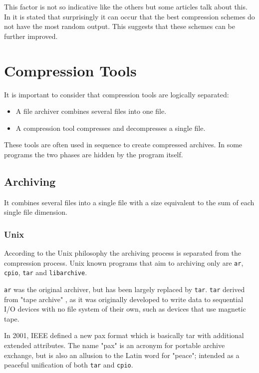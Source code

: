 \documentclass[12pt, a4paper]{report}
\begin{document}
This factor is not so indicative like the others but some articles talk about this.
In \cite{OnTheRandomnessOfCompressedData} it is stated that surprisingly it can occur that the best compression schemes do not
have the most random output.
This suggests that these schemes can be further improved.

\chapter{Compression Tools}

It is important to consider that compression tools are logically separated:

\begin{itemize}
  \item A file archiver combines several files into one file.
  \item A compression tool compresses and decompresses a single file.
\end{itemize}

These tools are often used in sequence to create compressed archives.
In some programs the two phases are hidden by the program itself.

\section{Archiving}

It combines several files into a single file with a size equivalent to the sum of each single file dimension.

\subsection{Unix}

According to the Unix philosophy the archiving process is separated from the compression process.
Unix known programs that aim to archiving only are \texttt{ar}, \texttt{cpio}, \texttt{tar} and \texttt{libarchive}.

\texttt{ar} was the original archiver, but has been largely replaced by \texttt{tar}.
\texttt{tar} derived from "tape archive" , as it was originally developed to write data to sequential I/O devices with no file
system of their own, such as devices that use magnetic tape.

In 2001, IEEE defined a new pax format which is basically tar with additional extended attributes.
The name "pax" is an acronym for portable archive exchange, but is also an allusion to the Latin word for "peace"; intended as a
peaceful unification of both \texttt{tar} and \texttt{cpio}.
\end{document}
